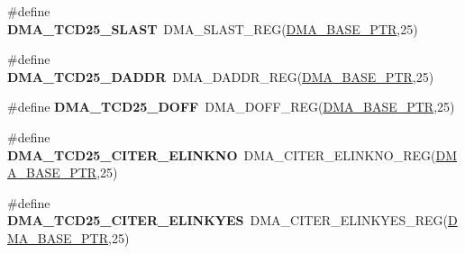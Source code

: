 \begin{DoxyCompactItemize}
\item 
\hypertarget{group___d_m_a___register___accessor___macros_ga47350419a133674d4fdcf1e805b81e6d}{}\#define {\bfseries D\+M\+A\+\_\+\+T\+C\+D25\+\_\+\+S\+L\+A\+S\+T}~D\+M\+A\+\_\+\+S\+L\+A\+S\+T\+\_\+\+R\+E\+G(\hyperlink{group___d_m_a___peripheral_ga6997fbc1b1973e9f27170217a3bd6f22}{D\+M\+A\+\_\+\+B\+A\+S\+E\+\_\+\+P\+T\+R},25)\label{group___d_m_a___register___accessor___macros_ga47350419a133674d4fdcf1e805b81e6d}

\item 
\hypertarget{group___d_m_a___register___accessor___macros_ga57383a5271c837d5d4e639b91da01eeb}{}\#define {\bfseries D\+M\+A\+\_\+\+T\+C\+D25\+\_\+\+D\+A\+D\+D\+R}~D\+M\+A\+\_\+\+D\+A\+D\+D\+R\+\_\+\+R\+E\+G(\hyperlink{group___d_m_a___peripheral_ga6997fbc1b1973e9f27170217a3bd6f22}{D\+M\+A\+\_\+\+B\+A\+S\+E\+\_\+\+P\+T\+R},25)\label{group___d_m_a___register___accessor___macros_ga57383a5271c837d5d4e639b91da01eeb}

\item 
\hypertarget{group___d_m_a___register___accessor___macros_ga6ef7675877cb532c5f8b466145c31828}{}\#define {\bfseries D\+M\+A\+\_\+\+T\+C\+D25\+\_\+\+D\+O\+F\+F}~D\+M\+A\+\_\+\+D\+O\+F\+F\+\_\+\+R\+E\+G(\hyperlink{group___d_m_a___peripheral_ga6997fbc1b1973e9f27170217a3bd6f22}{D\+M\+A\+\_\+\+B\+A\+S\+E\+\_\+\+P\+T\+R},25)\label{group___d_m_a___register___accessor___macros_ga6ef7675877cb532c5f8b466145c31828}

\item 
\hypertarget{group___d_m_a___register___accessor___macros_ga9ecb9015c222898472a8c5aa83ed160a}{}\#define {\bfseries D\+M\+A\+\_\+\+T\+C\+D25\+\_\+\+C\+I\+T\+E\+R\+\_\+\+E\+L\+I\+N\+K\+N\+O}~D\+M\+A\+\_\+\+C\+I\+T\+E\+R\+\_\+\+E\+L\+I\+N\+K\+N\+O\+\_\+\+R\+E\+G(\hyperlink{group___d_m_a___peripheral_ga6997fbc1b1973e9f27170217a3bd6f22}{D\+M\+A\+\_\+\+B\+A\+S\+E\+\_\+\+P\+T\+R},25)\label{group___d_m_a___register___accessor___macros_ga9ecb9015c222898472a8c5aa83ed160a}

\item 
\hypertarget{group___d_m_a___register___accessor___macros_gaa2f4ae217d3b8e6b1b00ffe382341237}{}\#define {\bfseries D\+M\+A\+\_\+\+T\+C\+D25\+\_\+\+C\+I\+T\+E\+R\+\_\+\+E\+L\+I\+N\+K\+Y\+E\+S}~D\+M\+A\+\_\+\+C\+I\+T\+E\+R\+\_\+\+E\+L\+I\+N\+K\+Y\+E\+S\+\_\+\+R\+E\+G(\hyperlink{group___d_m_a___peripheral_ga6997fbc1b1973e9f27170217a3bd6f22}{D\+M\+A\+\_\+\+B\+A\+S\+E\+\_\+\+P\+T\+R},25)\label{group___d_m_a___register___accessor___macros_gaa2f4ae217d3b8e6b1b00ffe382341237}


\end{DoxyCompactItemize}
